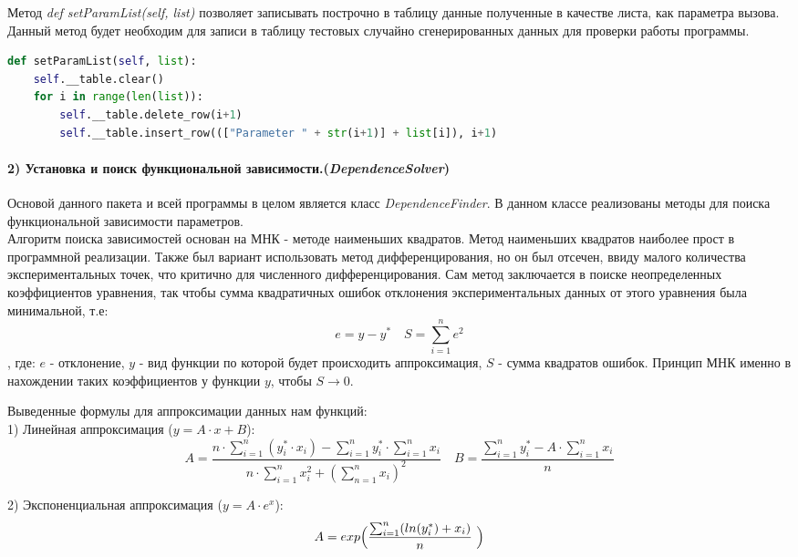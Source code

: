     Метод \textit{def setParamList(self, list)} позволяет записывать построчно в таблицу данные полученные в качестве листа, как параметра вызова. Данный метод будет необходим для записи в таблицу тестовых случайно сгенерированных данных для проверки работы программы.
    \begin{lstlisting}[language=Python]
def setParamList(self, list):
    self.__table.clear()
    for i in range(len(list)):
        self.__table.delete_row(i+1)
        self.__table.insert_row((["Parameter " + str(i+1)] + list[i]), i+1)
    \end{lstlisting}
    
	
	
	\paragraph{2) Установка и поиск функциональной зависимости.(\textit{DependenceSolver})
    \\
    }
	
	Основой данного пакета и всей программы в целом является класс \textit{DependenceFinder}. В данном классе реализованы методы для поиска функциональной зависимости параметров.\\
	Алгоритм поиска зависимостей основан на МНК - методе наименьших квадратов. Метод наименьших квадратов наиболее прост в программной реализации. Также был вариант использовать метод дифференцирования, но он был отсечен, ввиду малого количества экспериментальных точек, что критично для численного дифференцирования. Сам метод заключается в поиске неопределенных коэффициентов уравнения, так чтобы сумма квадратичных ошибок отклонения экспериментальных данных от этого уравнения была минимальной, т.е:\\
	$$e = y-y^* \quad S=\sum_{i=1}^{n} e^2 $$
	, где: $e$ - отклонение, $y$ - вид функции по которой будет происходить аппроксимация, $S$ - сумма квадратов ошибок. Принцип МНК именно в нахождении таких коэффициентов у функции $y$, чтобы $S \to 0$.
	
	Выведенные формулы для аппроксимации данных нам функций:\\

	1) Линейная аппроксимация ($y=A\cdot x + B$):
	$$A = \dfrac{ n\cdot \sum_{i=1}^n (y^*_i \cdot x_i) - \sum_{i=1}^n y^*_i \cdot \sum_{i=1}^n x_i} {n\cdot \sum_{i=1}^n x_i^2 + (\sum_{n=1}^n x_i)^2} \quad B = \frac{\sum_{i=1}^n y^*_i - A \cdot \sum_{i=1}^n x_i}{n}$$
	
	2) Экспоненциальная аппроксимация ($y = A \cdot e^x$):
    $$ A = exp \Bigr( \frac{\sum_{i=1}^n(ln (y^*_i) + x_i)}{n}\ \Bigl)$$

